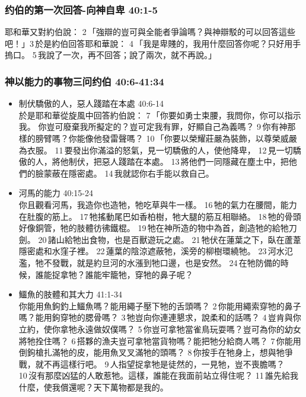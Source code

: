 \subsubsection{约伯的第一次回答-向神自卑 40:1-5}
耶和華又對約伯說： 2 「強辯的豈可與全能者爭論嗎？與神辯駁的可以回答這些吧！」3 於是約伯回答耶和華說： 4 「我是卑賤的，我用什麼回答你呢？只好用手摀口。 5 我說了一次，再不回答；說了兩次，就不再說。」


\subsubsection{神以能力的事物三问约伯 40:6-41:34}
\begin{itemize}
\itemsep-.45em
\item 制伏驕傲的人，惡人踐踏在本處 40:6-14\\
於是耶和華從旋風中回答約伯說： 7 「你要如勇士束腰，我問你，你可以指示我。
你豈可廢棄我所擬定的？豈可定我有罪，好顯自己為義嗎？ 9 你有神那樣的膀臂嗎？你能像他發雷聲嗎？
10 「你要以榮耀莊嚴為裝飾，以尊榮威嚴為衣服。 11 要發出你滿溢的怒氣，見一切驕傲的人，使他降卑， 12 見一切驕傲的人，將他制伏，把惡人踐踏在本處。 13 將他們一同隱藏在塵土中，把他們的臉蒙蔽在隱密處。 14 我就認你右手能以救自己。

\item 河馬的能力 40:15-24\\
你且觀看河馬，我造你也造牠，牠吃草與牛一樣。 16 牠的氣力在腰間，能力在肚腹的筋上。 17 牠搖動尾巴如香柏樹，牠大腿的筋互相聯絡。 18 牠的骨頭好像銅管，牠的肢體彷彿鐵棍。 19 牠在神所造的物中為首，創造牠的給牠刀劍。 20 諸山給牠出食物，也是百獸遊玩之處。 21 牠伏在蓮葉之下，臥在蘆葦隱密處和水窪子裡。 22 蓮葉的陰涼遮蔽牠，溪旁的柳樹環繞牠。 23 河水氾濫，牠不發戰，就是約旦河的水漲到牠口邊，也是安然。 24 在牠防備的時候，誰能捉拿牠？誰能牢籠牠，穿牠的鼻子呢？

\item 鱷魚的肢體和其大力 41:1-34\\
你能用魚鉤釣上鱷魚嗎？能用繩子壓下牠的舌頭嗎？ 2 你能用繩索穿牠的鼻子嗎？能用鉤穿牠的腮骨嗎？ 3 牠豈向你連連懇求，說柔和的話嗎？ 4 豈肯與你立約，使你拿牠永遠做奴僕嗎？ 5 你豈可拿牠當雀鳥玩耍嗎？豈可為你的幼女將牠拴住嗎？ 6 搭夥的漁夫豈可拿牠當貨物嗎？能把牠分給商人嗎？ 7 你能用倒鉤槍扎滿牠的皮，能用魚叉叉滿牠的頭嗎？ 8 你按手在牠身上，想與牠爭戰，就不再這樣行吧。 9 人指望捉拿牠是徒然的，一見牠，豈不喪膽嗎？ 10 沒有那麼凶猛的人敢惹牠。這樣，誰能在我面前站立得住呢？ 11 誰先給我什麼，使我償還呢？天下萬物都是我的。


\end{itemize}

